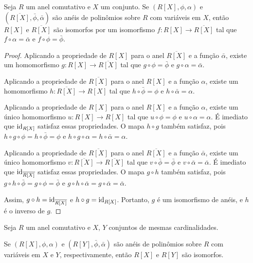 \begin{prop}
Seja $R$ um anel comutativo e $X$ um conjunto. Se $(R[X], \phi, \alpha)$ e $(\overline{R[X]}, \bar \phi, \bar \alpha)$ são anéis de polinômios sobre $R$ com variáveis em $X$, então $R[X]$ e $\overline{R[X]}$ são isomorfos por um isomorfismo $f:R[X]\rightarrow \overline{R[X]}$ tal que $f\circ \alpha=\bar \alpha$ e $f\circ \phi=\bar \phi$.
\end{prop}
\begin{proof}
    Aplicando a propriedade de $R[X]$ para o anel $\overline{R[X]}$ e a função $\bar \alpha$, existe um homomorfismo $g:R[X]\rightarrow \overline{R[X]}$ tal que $g\circ \phi=\bar \phi$ e $g\circ \alpha=\bar \alpha$.

    Aplicando a propriedade de $\overline{R[X]}$ para o anel $R[X]$ e a função $\alpha$, existe um homomorfismo $h:\overline{R[X]}\rightarrow R[X]$ tal que $h\circ \bar \phi=\phi$ e $h\circ \bar \alpha=\alpha$.

    Aplicando a propriedade de $R[X]$ para o anel $R[X]$ e a função $ \alpha$, existe um único homomorfismo $u:R[X]\rightarrow R[X]$ tal que $u\circ \phi=\phi$ e $u\circ \alpha=\alpha$.
    É imediato que $\operatorname{id}_{R[X]}$ satisfaz essas propriedades. O mapa $h\circ g$ também satisfaz, pois $h\circ g\circ \phi=h\circ \bar \phi=\phi$ e $h\circ g\circ \alpha=h\circ \bar \alpha=\alpha$.

    Aplicando a propriedade de $\overline{R[X]}$ para o anel $\overline{R[X]}$ e a função $\bar \alpha$, existe um único homomorfismo $v:\overline{R[X]}\rightarrow \overline{R[X]}$ tal que $v\circ \bar \phi=\bar \phi$ e $v\circ \bar \alpha=\bar \alpha$.
    É imediato que $\operatorname{id}_{\overline{R[X]}}$ satisfaz essas propriedades. O mapa $g\circ h$ também satisfaz, pois $g\circ h\circ \bar \phi=g\circ \phi=\bar \phi$ e $g\circ h\circ \bar \alpha=g\circ \bar \alpha=\bar \alpha$.

    Assim, $g\circ h=\operatorname{id}_{\overline{R[X]}}$ e $h\circ g=\operatorname{id}_{R[X]}$. Portanto, $g$ é um isomorfismo de anéis, e $h$ é o inverso de $g$.
\end{proof}

\begin{corol}
    Seja $R$ um anel comutativo e $X$, $Y$ conjuntos de mesmas cardinalidades.

    Se $(R[X], \phi, \alpha)$ e $(R[Y], \bar \phi, \bar \alpha)$ são anéis de polinômios sobre $R$ com variáveis em $X$ e $Y$, respectivamente, então $R[X]$ e $R[Y]$ são isomorfos.
\end{corol}

